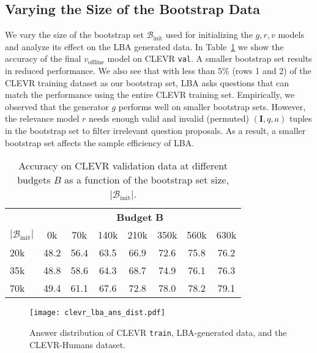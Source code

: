 \documentclass[10pt,twocolumn,letterpaper]{article}
\newcommand{\imageQApair}{(\mathbf{I}, q, a)}
\newcommand{\voffline}{v_{\mathrm{offline}}}
\newcommand{\bootstrap}{\mathcal{B}_{\mathrm{init}}}
\newcommand{\clevrtrain}{\texttt{train}\xspace}
\newcommand{\clevrval}{\texttt{val}\xspace}
\begin{document}
\subsection{Varying the Size of the Bootstrap Data}
We vary the size of the bootstrap set $\bootstrap$ used for initializing the $g,r,v$ models and analyze its effect on the LBA generated data. In Table~\ref{tab:bootstrap} we show the accuracy of the final $\voffline$ model on CLEVR \clevrval. A smaller bootstrap set results in reduced performance. We also see that with less than $5\%$ (rows 1 and 2) of the CLEVR training dataset as our bootstrap set, LBA asks questions that can match the performance using the entire CLEVR training set. Empirically, we observed that the generator $g$ performs well on smaller bootstrap sets. However, the relevance model $r$ needs enough valid and invalid (permuted) $\imageQApair$ tuples in the bootstrap set to filter irrelevant question proposals. As a result, a smaller bootstrap set affects the sample efficiency of LBA.

\begin{table}[!h]
\setlength{\tabcolsep}{0.4em}
\centering
\footnotesize{
    \begin{tabular}{@{}l|ccccccc@{}}
     & \multicolumn{7}{c}{\textbf{Budget} $\bm{B}$} \\
    $\bm{|\bootstrap|}$ & 0k & 70k & 140k & 210k & 350k & 560k & 630k \\
    \shline
    20k & 48.2 & 56.4 & 63.5 & 66.9 & 72.6 & 75.8 & 76.2 \\
    35k & 48.8 & 58.6 & 64.3 & 68.7 & 74.9 & 76.1 & 76.3 \\
    70k & 49.4 & 61.1 & 67.6 & 72.8 & 78.0 & 78.2 & 79.1 \\
    \end{tabular}
\caption{Accuracy on CLEVR validation data at different budgets $B$ as a function of the bootstrap set size, $|\bootstrap|$.}
\label{tab:bootstrap}
    }
\vspace{-0.5em}
\end{table}

\begin{figure}[!t]
    \centering
    \texttt{[image: clevr\_lba\_ans\_dist.pdf]}
    \vspace{-0.15in}
    \caption{Answer distribution of CLEVR \clevrtrain, LBA-generated data, and the CLEVR-Humans dataset.}
    \label{fig:clevr_sets_ans_dist}
\vspace{-0.6em}
\end{figure}
\end{document}

